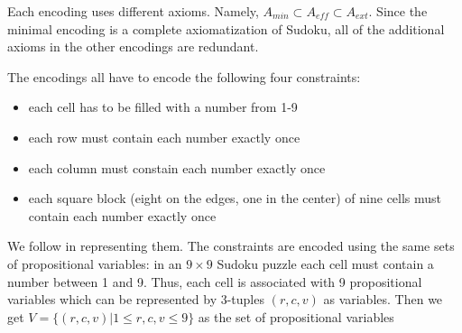 \documentclass{article}
\begin{document}
Each encoding uses different axioms. Namely, $A_{min}\subset A_{eff}\subset A_{ext}$. Since the minimal encoding is a complete axiomatization of Sudoku, all of the additional axioms in the other encodings are redundant.


The encodings all have to encode the following four constraints:

\begin{itemize}
	\item each cell has to be filled with a number from 1-9
	\item each row must contain each number exactly once
	\item each column must constain each number exactly once
	\item each square block (eight on the edges, one in the center) of nine cells must contain each number exactly once
\end{itemize}

We follow  in representing them. The constraints are encoded using the same sets of propositional variables: in an $9\times 9$ Sudoku puzzle each cell must contain a number between 1 and 9. Thus, each cell is associated with 9 propositional variables which can be represented by 3-tuples $(r, c, v)$ as variables. %
Then we get $V = \{(r, c, v)|1 \leq r, c, v \leq 9\}$ as the set of propositional variables

\end{document}
